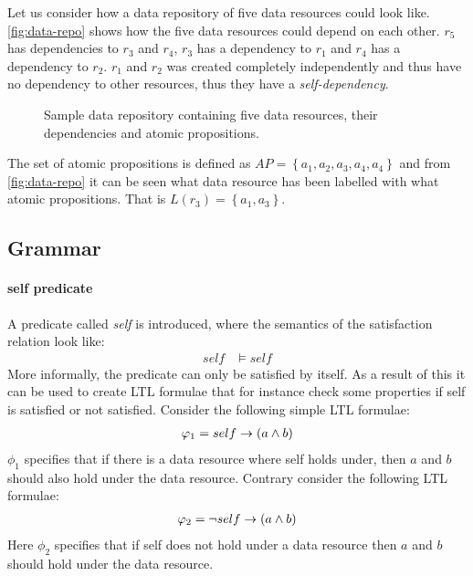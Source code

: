 \begin{example}\label{ex:data-repo}
Let us consider how a data repository of five data resources could look like. \autoref{fig:data-repo} shows how the five data resources could depend on each other. $r_5$ has dependencies to $r_3$ and $r_4$, $r_3$ has a dependency to $r_1$ and $r_4$ has a dependency to $r_2$. $r_1$ and $r_2$ was created completely independently and thus have no dependency to other resources, thus they have a \emph{self-dependency}.
\begin{figure}[!ht] 
    \begin{center}
        
        \caption{Sample data repository containing five data resources, their dependencies and atomic propositions.}
        \label{fig:data-repo}
    \end{center}
\end{figure}
The set of atomic propositions is defined as $AP = \left\{ a_1, a_2, a_3, a_4, a_4 \right\}$ and from \autoref{fig:data-repo} it can be seen what data resource has been labelled with what atomic propositions. That is $L(r_3) = \left\{ a_1, a_3 \right\}$.
\end{example}

\subsection{Grammar}\label{sec:grammar}



\paragraph{self predicate}
A predicate called \emph{self} is introduced, where the semantics of the satisfaction relation look like:
\begin{align*}
    self &\models self
\end{align*}
More informally, the predicate can only be satisfied by itself. As a result of this it can be used to create LTL formulae that for instance check some properties if self is satisfied or not satisfied. Consider the following simple LTL formulae:
\begin{align*}
    \varphi_1 = self \rightarrow \left( a \land b \right)
\end{align*}
$\phi_1$ specifies that if there is a data resource where self holds under, then $a$ and $b$ should also hold under the data resource. Contrary consider the following LTL formulae:
\begin{align*}
    \varphi_2 = \neg self \rightarrow \left( a \land b \right)
\end{align*}
Here $\phi_2$ specifies that if self does not hold under a data resource then $a$ and $b$ should hold under the data resource.

